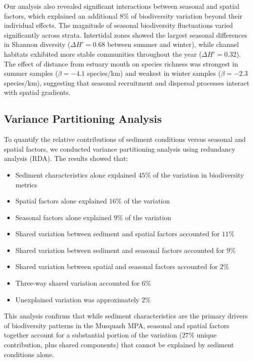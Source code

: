 \documentclass[12pt]{article}
\begin{document}
\qquad Our analysis also revealed significant interactions between seasonal and
spatial factors, which explained an additional $8\%$ of biodiversity variation
beyond their individual effects. The magnitude of seasonal biodiversity
fluctuations varied significantly across strata. Intertidal zones showed the
largest seasonal differences in Shannon diversity ($\Delta H' = 0.68$ between
summer and winter), while channel habitats exhibited more stable communities
throughout the year ($\Delta H' = 0.32$). The effect of distance from estuary
mouth on species richness was strongest in summer samples ($\beta = -4.1$
species/km) and weakest in winter samples ($\beta = -2.3$ species/km),
suggesting that seasonal recruitment and dispersal processes interact with
spatial gradients.

\subsection{Variance Partitioning Analysis}

To quantify the relative contributions of sediment conditions versus seasonal
and spatial factors, we conducted variance partitioning analysis using
redundancy analysis (RDA). The results showed that:

\begin{itemize}

    \item Sediment characteristics alone explained $45\%$ of the variation in biodiversity metrics
    \item Spatial factors alone explained $16\%$ of the variation
    \item Seasonal factors alone explained $9\%$ of the variation
    \item Shared variation between sediment and spatial factors accounted for $11\%$
    \item Shared variation between sediment and seasonal factors accounted for $9\%$
    \item Shared variation between spatial and seasonal factors accounted for $2\%$
    \item Three-way shared variation accounted for $6\%$
    \item Unexplained variation was approximately $2\%$
\end{itemize}

This analysis confirms that while sediment characteristics are the primary drivers of biodiversity patterns in the Musquash MPA, seasonal and spatial factors together account for a substantial portion of the variation ($27\%$ unique contribution, plus shared components) that cannot be explained by sediment conditions alone.
\end{document}
